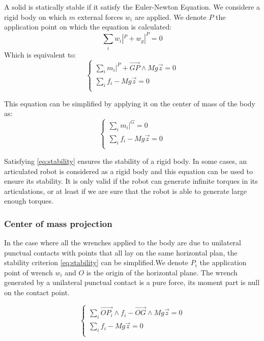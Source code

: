 A solid is statically stable if it satisfy the Euler-Newton Equation. We considere a rigid body on which $m$ external forces $w_i$ are applied. We denote $P$ the application point on which the equation is calculated:
\begin{equation}
  \sum\limits_i w_i|^P + w_g|^P = 0
\end{equation}
Which is equivalent to:
\begin{equation}
\left\{
\begin{array}{r}
  \sum\limits_i m_i|^P + \overrightarrow{GP}\wedge Mg\vec{z} = 0 \\
  \sum\limits_i f_i - Mg\vec{z} = 0 \\
\end{array}
\right.
\end{equation}

This equation can be simplified by applying it on the center of mass of the body as:
\begin{equation}
\left\{
\begin{array}{r}
  \sum\limits_i m_i|^G = 0 \\
  \sum\limits_i f_i - Mg\vec{z} = 0 \\
\end{array}
\right.
\label{eq:stability}
\end{equation}

Satisfying \ref{eq:stability} ensures the stability of a rigid body.
In some cases, an articulated robot is considered as a rigid body and this equation can be used to ensure its stability.
It is only valid if the robot can generate infinite torques in its articulations, or at least if we are sure that the robot is able to generate large enough torques.

\subsubsection{Center of mass projection}
\label{subsub:center_of_mass_projection}

In the case where all the wrenches applied to the body are due to unilateral punctual contacts with points that all lay on the same horizontal plan, the stability criterion \ref{eq:stability} can be simplified.We denote $P_i$ the application point of wrench $w_i$ and $O$ is the origin of the horizontal plane.
The wrench generated by a unilateral punctual contact is a pure force, its moment part is null on the contact point.

\begin{equation}
\left\{
\begin{array}{r}
  \sum\limits_i \overrightarrow{OP_i}\wedge f_i - \overrightarrow{OG} \wedge Mg\vec{z} = 0 \\
  \sum\limits_i f_i - Mg\vec{z} = 0 \\
\end{array}
\right.
\end{equation}

